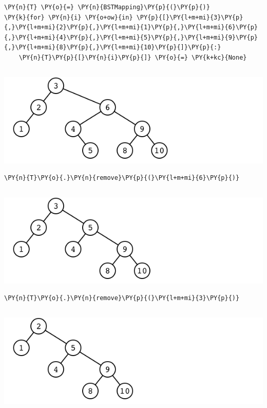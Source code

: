 \begin{Verbatim}[commandchars=\\\{\}]
\PY{n}{T} \PY{o}{=} \PY{n}{BSTMapping}\PY{p}{(}\PY{p}{)}
\PY{k}{for} \PY{n}{i} \PY{o+ow}{in} \PY{p}{[}\PY{l+m+mi}{3}\PY{p}{,}\PY{l+m+mi}{2}\PY{p}{,}\PY{l+m+mi}{1}\PY{p}{,}\PY{l+m+mi}{6}\PY{p}{,}\PY{l+m+mi}{4}\PY{p}{,}\PY{l+m+mi}{5}\PY{p}{,}\PY{l+m+mi}{9}\PY{p}{,}\PY{l+m+mi}{8}\PY{p}{,}\PY{l+m+mi}{10}\PY{p}{]}\PY{p}{:}
    \PY{n}{T}\PY{p}{[}\PY{n}{i}\PY{p}{]} \PY{o}{=} \PY{k+kc}{None}
\end{Verbatim}


\begin{Verbatim}

\end{Verbatim}


\includegraphics[width=\textwidth]{./figures/bstremoval_example1.png}

\begin{Verbatim}[commandchars=\\\{\}]
\PY{n}{T}\PY{o}{.}\PY{n}{remove}\PY{p}{(}\PY{l+m+mi}{6}\PY{p}{)}
\end{Verbatim}


\begin{Verbatim}

\end{Verbatim}


\includegraphics[width=\textwidth]{./figures/bstremoval_example2.png}

\begin{Verbatim}[commandchars=\\\{\}]
\PY{n}{T}\PY{o}{.}\PY{n}{remove}\PY{p}{(}\PY{l+m+mi}{3}\PY{p}{)}
\end{Verbatim}


\begin{Verbatim}

\end{Verbatim}


\includegraphics[width=\textwidth]{./figures/bstremoval_example3.png}
